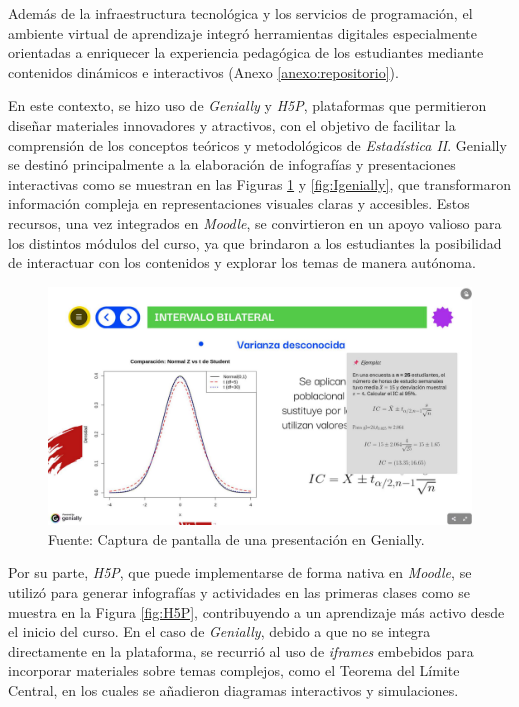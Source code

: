 \documentclass[letter,oneside,12pt,spanish]{report}
\begin{document}
Además de la infraestructura tecnológica y los servicios de programación, el ambiente virtual de aprendizaje integró herramientas digitales especialmente orientadas a enriquecer la experiencia pedagógica de los estudiantes mediante contenidos dinámicos e interactivos (Anexo \ref{anexo:repositorio}).

En este contexto, se hizo uso de \textit{Genially} y \textit{H5P}, plataformas que permitieron diseñar materiales innovadores y atractivos, con el objetivo de facilitar la comprensión de los conceptos teóricos y metodológicos de \textit{Estadística II}. Genially se destinó principalmente a la elaboración de infografías y presentaciones interactivas como se muestran en las Figuras \ref{fig:Pgenially} y \ref{fig:Igenially}, que transformaron información compleja en representaciones visuales claras y accesibles. Estos recursos, una vez integrados en \textit{Moodle}, se convirtieron en un apoyo valioso para los distintos módulos del curso, ya que brindaron a los estudiantes la posibilidad de interactuar con los contenidos y explorar los temas de manera autónoma.

\begin{figure}[ht]
	\centering
	\includegraphics[width=1\textwidth]{Figs/Presentacion_Genially.pdf}
	\label{fig:Pgenially}
	\\Fuente: Captura de pantalla de una presentación en Genially.
\end{figure}

Por su parte, \textit{H5P}, que puede implementarse de forma nativa en \textit{Moodle}, se utilizó para generar infografías y actividades en las primeras clases como se muestra en la Figura \ref{fig:H5P}, contribuyendo a un aprendizaje más activo desde el inicio del curso. En el caso de \textit{Genially}, debido a que no se integra directamente en la plataforma, se recurrió al uso de \textit{iframes} embebidos para incorporar materiales sobre temas complejos, como el Teorema del Límite Central, en los cuales se añadieron diagramas interactivos y simulaciones.
\end{document}
